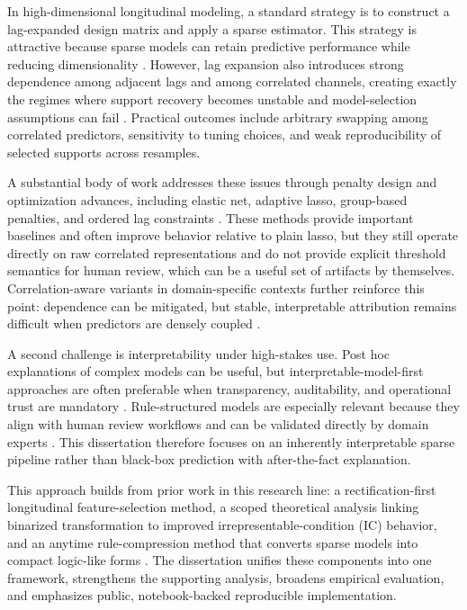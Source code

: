 In high-dimensional longitudinal modeling, a standard strategy is to construct a lag-expanded design matrix and apply a sparse estimator. This strategy is attractive because sparse models can retain predictive performance while reducing dimensionality \autocites{tibshirani1996,AYNg2004Feature}. However, lag expansion also introduces strong dependence among adjacent lags and among correlated channels, creating exactly the regimes where support recovery becomes unstable and model-selection assumptions can fail \autocites{PZhao2006model,freijeirogonzalez2022}. Practical outcomes include arbitrary swapping among correlated predictors, sensitivity to tuning choices, and weak reproducibility of selected supports across resamples.

A substantial body of work addresses these issues through penalty design and optimization advances, including elastic net, adaptive lasso, group-based penalties, and ordered lag constraints \autocites{HZou2005Regularization,HZou2006adaptive,yuan2006,meier2008,RTibshirani2016ordered}. These methods provide important baselines and often improve behavior relative to plain lasso, but they still operate directly on raw correlated representations and do not provide explicit threshold semantics for human review, which can be a useful set of artifacts by themselves. Correlation-aware variants in domain-specific contexts further reinforce this point: dependence can be mitigated, but stable, interpretable attribution remains difficult when predictors are densely coupled \autocites{HZhu2021variable,katrutsa2017,yang2023model}.

A second challenge is interpretability under high-stakes use. Post hoc explanations of complex models can be useful, but interpretable-model-first approaches are often preferable when transparency, auditability, and operational trust are mandatory \autocites{CRudin2019Stop,WJMurdoch2019Definitions}. Rule-structured models are especially relevant because they align with human review workflows and can be validated directly by domain experts \autocites{EAngelino2018Learning,EBoros1997Logical,EBoros2000implementation}. This dissertation therefore focuses on an inherently interpretable sparse pipeline rather than black-box prediction with after-the-fact explanation.

This approach builds from prior work in this research line: a rectification-first longitudinal feature-selection method, a scoped theoretical analysis linking binarized transformation to improved irrepresentable-condition (IC) behavior, and an anytime rule-compression method that converts sparse models into compact logic-like forms \autocites{orender2022,JOrender2025Efficient,JOrender2025Anytime}. The dissertation unifies these components into one framework, strengthens the supporting analysis, broadens empirical evaluation, and emphasizes public, notebook-backed reproducible implementation.

